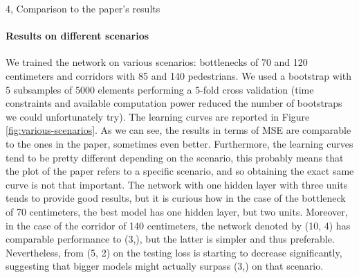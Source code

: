 \documentclass[10pt,a4paper]{article}
\begin{document}
\begin{task}{4, Comparison to the paper's results}
\paragraph{Results on different scenarios}
We trained the network on various scenarios: bottlenecks of 70 and 120 centimeters  and corridors with 85 and 140 pedestrians.
We used a bootstrap with 5 subsamples of 5000 elements performing a 5-fold cross validation (time constraints and available computation power reduced the number of bootstraps we could unfortunately try).
The learning curves are reported in Figure \ref{fig:various-scenarios}.
As we can see, the results in terms of MSE are comparable to the ones in the paper, sometimes even better.
Furthermore, the learning curves tend to be pretty different depending on the scenario, this probably means that the plot of the paper refers to a specific scenario, and so obtaining the exact same curve is not that important.
The network with one hidden layer with three units tends to provide good results, but it is curious how in the case of the bottleneck of 70 centimeters, the best model has one hidden layer, but two units.
Moreover, in the case of the corridor of 140 centimeters, the network denoted by (10, 4) has comparable performance to (3,), but the latter is simpler and thus preferable.
Nevertheless, from (5, 2) on the testing loss is starting to decrease significantly, suggesting that bigger models might actually surpass (3,) on that scenario.


\end{task}
\end{document}
